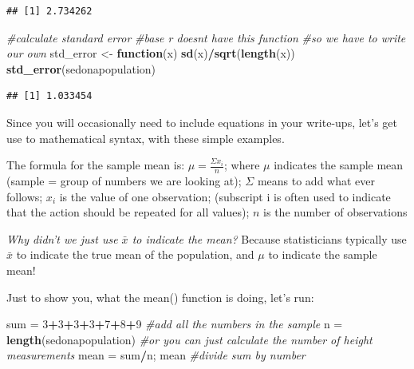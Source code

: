 \documentclass[
]{book}
\newenvironment{Shaded}{\begin{snugshade}}{\end{snugshade}}
\newcommand{\CommentTok}[1]{\textcolor[rgb]{0.56,0.35,0.01}{\textit{#1}}}
\newcommand{\ControlFlowTok}[1]{\textcolor[rgb]{0.13,0.29,0.53}{\textbf{#1}}}
\newcommand{\DecValTok}[1]{\textcolor[rgb]{0.00,0.00,0.81}{#1}}
\newcommand{\FunctionTok}[1]{\textcolor[rgb]{0.13,0.29,0.53}{\textbf{#1}}}
\newcommand{\NormalTok}[1]{#1}
\newcommand{\OtherTok}[1]{\textcolor[rgb]{0.56,0.35,0.01}{#1}}
\newcommand{\SpecialCharTok}[1]{\textcolor[rgb]{0.81,0.36,0.00}{\textbf{#1}}}
\begin{document}
\begin{verbatim}
## [1] 2.734262
\end{verbatim}

\begin{Shaded}
\begin{Highlighting}[]
\CommentTok{\#calculate standard error}
\CommentTok{\#base r doesn\textquotesingle{}t have this function}
\CommentTok{\#so we have to write our own}
\NormalTok{std\_error }\OtherTok{\textless{}{-}} \ControlFlowTok{function}\NormalTok{(x) }\FunctionTok{sd}\NormalTok{(x)}\SpecialCharTok{/}\FunctionTok{sqrt}\NormalTok{(}\FunctionTok{length}\NormalTok{(x))}
\FunctionTok{std\_error}\NormalTok{(sedonapopulation)}
\end{Highlighting}
\end{Shaded}

\begin{verbatim}
## [1] 1.033454
\end{verbatim}

Since you will occasionally need to include equations in your write-ups, let's get use to mathematical syntax, with these simple examples.

The formula for the sample mean is: \(\mu = \frac{\Sigma x_i}{n}\);
where \(\mu\) indicates the sample mean (sample = group of numbers we are looking at);
\(\Sigma\) means to add what ever follows;
\(x_{i}\) is the value of one observation; (subscript i is often used to indicate that the action should be repeated for all values);
\(n\) is the number of observations

\emph{Why didn't we just use \(\bar{x}\) to indicate the mean?}
Because statisticians typically use \(\bar{x}\) to indicate the true mean of the population, and \(\mu\) to indicate the sample mean!

Just to show you, what the mean() function is doing, let's run:

\begin{Shaded}
\begin{Highlighting}[]
\NormalTok{sum }\OtherTok{=} \DecValTok{3}\SpecialCharTok{+}\DecValTok{3}\SpecialCharTok{+}\DecValTok{3}\SpecialCharTok{+}\DecValTok{3}\SpecialCharTok{+}\DecValTok{7}\SpecialCharTok{+}\DecValTok{8}\SpecialCharTok{+}\DecValTok{9} \CommentTok{\#add all the numbers in the sample}
\NormalTok{n }\OtherTok{=} \FunctionTok{length}\NormalTok{(sedonapopulation) }\CommentTok{\#or you can just calculate the number of height measurements}
\NormalTok{mean }\OtherTok{=}\NormalTok{ sum}\SpecialCharTok{/}\NormalTok{n; mean }\CommentTok{\#divide sum by number}
\end{Highlighting}
\end{Shaded}
\end{document}
